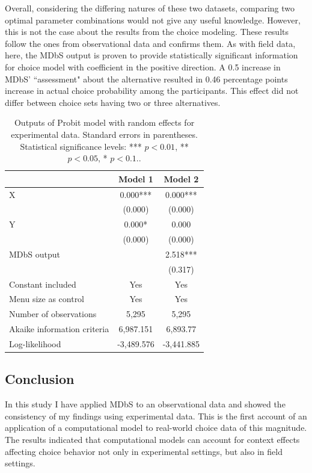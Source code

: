 \documentclass[a4paper,12pt]{article}
\begin{document}
Overall, considering the differing natures of these two datasets, comparing two optimal parameter combinations would not give any useful knowledge. However, this is not the case about the results from the choice modeling. These results follow the ones from observational data and confirms them. As with field data, here, the MDbS output is proven to provide statistically significant information for choice model with coefficient in the positive direction. A 0.5 increase in MDbS' ``assessment" about the alternative resulted in 0.46 percentage points increase in actual choice probability among the participants. This effect did not differ between choice sets having two or three alternatives.

\begin{table}
    \centering
    \renewcommand{\arraystretch}{1.5}
    \begin{tabular}{lcc}
    \hline
     & Model 1 & Model 2 \\
    \hline
    X & 0.000*** & 0.000*** \\
     & ($0.000$) & ($0.000$) \\[1ex]
    Y & 0.000* & 0.000 \\
     & ($0.000$) & ($0.000$) \\[1ex]
    MDbS output & & 2.518*** \\
     & & (0.317) \\[1ex]
    Constant included & Yes & Yes \\[1ex]
    Menu size as control & Yes & Yes \\[1ex]
    Number of observations & 5,295 & 5,295 \\[1ex]
    Akaike information criteria & 6,987.151 & 6,893.77 \\[1ex]
    Log-likelihood & -3,489.576 & -3,441.885 \\
    \hline
    \end{tabular}
    \caption{Outputs of Probit model with random effects for experimental data. Standard errors in parentheses. Statistical significance levels: *** $p<0.01$, ** $p<0.05$, * $p<0.1.$.}
    \label{tab:noguchiProbitResults}
\end{table}

\subsection{Conclusion}

In this study I have applied MDbS to an observational data and showed the consistency of my findings using experimental data. This is the first account of an application of a computational model to real-world choice data of this magnitude. The results indicated that computational models can account for context effects affecting choice behavior not only in experimental settings, but also in field settings.
\end{document}
